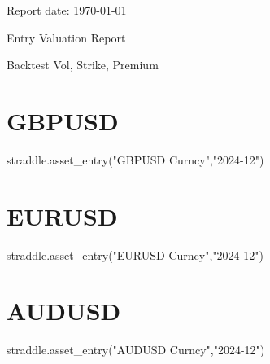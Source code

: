 \documentclass{article}
\begin{document}
\begin{titlepage}
    \centering
    {\Large {} \par}
    \vspace{1cm} 
    {Report date: \today  \par}
    \vspace{6cm} 
    {\Huge Entry Valuation Report\par}
    \vspace{2cm}
    {\large Backtest Vol, Strike, Premium\par}
\end{titlepage}

\newpage
\tableofcontents  %

\newpage
\section{GBPUSD}

\begin{pycode}
straddle.asset_entry("GBPUSD Curncy","2024-12")
\end{pycode}

\newpage
\section{EURUSD}

\begin{pycode}
straddle.asset_entry("EURUSD Curncy","2024-12")
\end{pycode}

\newpage
\section{AUDUSD}

\begin{pycode}
straddle.asset_entry("AUDUSD Curncy","2024-12")
\end{pycode}
\end{document}
